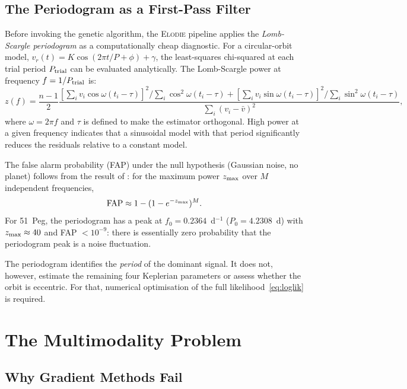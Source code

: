 \documentclass[12pt]{article}
\begin{document}
\subsection{The Periodogram as a First-Pass Filter}
\label{sec:periodogram}

Before invoking the genetic algorithm, the \textsc{Elodie} pipeline
applies the \emph{Lomb-Scargle periodogram} \citep{Lomb1976,Scargle1982}
as a computationally cheap diagnostic.  For a circular-orbit model,
$v_r(t) = K\cos(2\pi t/P + \phi) + \gamma$, the least-squares
chi-squared at each trial period $P_{\rm trial}$ can be evaluated
analytically.  The Lomb-Scargle power at frequency $f = 1/P_{\rm trial}$
is:
\begin{equation}\label{eq:lomb}
  z(f) = \frac{n-1}{2}
  \frac{[\sum_i v_i\cos\omega(t_i-\tau)]^2/\sum_i\cos^2\omega(t_i-\tau)
      + [\sum_i v_i\sin\omega(t_i-\tau)]^2/\sum_i\sin^2\omega(t_i-\tau)}
  {\sum_i (v_i - \bar v)^2},
\end{equation}
where $\omega = 2\pi f$ and $\tau$ is defined to make the estimator
orthogonal.  High power at a given frequency indicates that a sinusoidal
model with that period significantly reduces the residuals relative
to a constant model.

The false alarm probability (FAP) under the null hypothesis
(Gaussian noise, no planet) follows from the result of
\citet{Scargle1982}: for the maximum power $z_{\rm max}$ over $M$
independent frequencies,
\begin{equation}\label{eq:fap}
  \text{FAP} \approx 1 - (1-e^{-z_{\rm max}})^M.
\end{equation}
For 51~Peg, the periodogram has a peak at $f_0 = 0.2364$~d$^{-1}$
($P_0 = 4.2308$~d) with $z_{\rm max} \approx 40$ and FAP $< 10^{-9}$:
there is essentially zero probability that the periodogram peak is a
noise fluctuation.

The periodogram identifies the \emph{period} of the dominant
signal.  It does not, however, estimate the remaining four Keplerian
parameters or assess whether the orbit is eccentric.  For that,
numerical optimisation of the full likelihood~\eqref{eq:loglik}
is required.

\section{The Multimodality Problem}
\label{sec:multimodal}

\subsection{Why Gradient Methods Fail}
\end{document}
